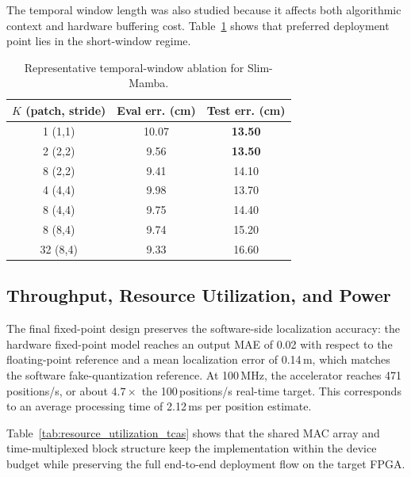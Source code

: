 \documentclass[lettersize,journal]{IEEEtran}
\begin{document}
The temporal window length was also studied because it affects both
algorithmic context and hardware buffering cost. Table~\ref{tab:k_ablation_tcas}
shows that preferred deployment point lies in the short-window regime.

\begin{table}[!t]
\caption{Representative temporal-window ablation for Slim-Mamba.}
\label{tab:k_ablation_tcas}
\begin{center}
\footnotesize
\setlength{\tabcolsep}{6pt}
\renewcommand{\arraystretch}{1.08}
\begin{tabular}{|c|c|c|}
\hline
\textbf{\(K\) (patch, stride)}
& \textbf{Eval err. (cm)}
& \textbf{Test err. (cm)} \\
\hline
1 (1,1) & 10.07 & \textbf{13.50} \\
\hline
2 (2,2) & 9.56 & \textbf{13.50} \\
\hline
8 (2,2) & 9.41 & 14.10 \\
\hline
4 (4,4) & 9.98 & 13.70 \\
\hline
8 (4,4) & 9.75 & 14.40 \\
\hline
8 (8,4) & 9.74 & 15.20 \\
\hline
32 (8,4) & 9.33 & 16.60 \\
\hline
\end{tabular}
\end{center}
\end{table}

\subsection{Throughput, Resource Utilization, and Power}

The final fixed-point design preserves the software-side localization accuracy:
the hardware fixed-point model reaches an output MAE of 0.02 with respect to the
floating-point reference and a mean localization error of 0.14\,m, which matches
the software fake-quantization reference. At 100\,MHz, the accelerator reaches
471\,positions/s, or about \(4.7\times\) the 100\,positions/s real-time target. This
corresponds to an average processing time of 2.12\,ms per position estimate.

Table~\ref{tab:resource_utilization_tcas} shows that the shared MAC array and
time-multiplexed block structure keep the implementation within the device
budget while preserving the full end-to-end deployment flow on the target FPGA.
\end{document}

